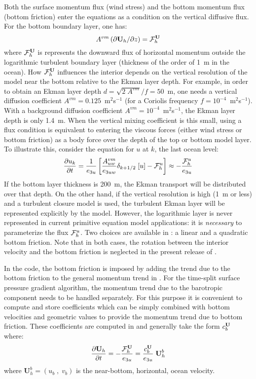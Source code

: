 \documentclass[../tex_main/NEMO_manual]{subfiles}
\begin{document}
Both the surface momentum flux (wind stress) and the bottom momentum flux (bottom friction) enter the equations as
a condition on the vertical diffusive flux.
For the bottom boundary layer, one has:
\begin{equation} \label{eq:zdfbfr_flux}
A^{vm} \left( \partial {\textbf U}_h / \partial z \right) = {{\cal F}}_h^{\textbf U}
\end{equation}
where ${\cal F}_h^{\textbf U}$ is represents the downward flux of horizontal momentum outside
the logarithmic turbulent boundary layer (thickness of the order of 1~m in the ocean).
How ${\cal F}_h^{\textbf U}$ influences the interior depends on the vertical resolution of the model near
the bottom relative to the Ekman layer depth.
For example, in order to obtain an Ekman layer depth $d = \sqrt{2\;A^{vm}} / f = 50$~m,
one needs a vertical diffusion coefficient $A^{vm} = 0.125$~m$^2$s$^{-1}$
(for a Coriolis frequency $f = 10^{-4}$~m$^2$s$^{-1}$).
With a background diffusion coefficient $A^{vm} = 10^{-4}$~m$^2$s$^{-1}$, the Ekman layer depth is only 1.4~m. 
When the vertical mixing coefficient is this small, using a flux condition is equivalent to
entering the viscous forces (either wind stress or bottom friction) as a body force over the depth of the top or
bottom model layer.
To illustrate this, consider the equation for $u$ at $k$, the last ocean level:
\begin{equation} \label{eq:zdfbfr_flux2}
\frac{\partial u_k}{\partial t} = \frac{1}{e_{3u}} \left[ \frac{A_{uw}^{vm}}{e_{3uw}} \delta_{k+1/2}\;[u] - {\cal F}^u_h \right] \approx - \frac{{\cal F}^u_{h}}{e_{3u}}
\end{equation}
If the bottom layer thickness is 200~m, the Ekman transport will be distributed over that depth.
On the other hand, if the vertical resolution is high (1~m or less) and a turbulent closure model is used,
the turbulent Ekman layer will be represented explicitly by the model.
However, the logarithmic layer is never represented in current primitive equation model applications:
it is \emph{necessary} to parameterize the flux ${\cal F}^u_h $.
Two choices are available in \NEMO: a linear and a quadratic bottom friction.
Note that in both cases, the rotation between the interior velocity and the bottom friction is neglected in
the present release of \NEMO.

In the code, the bottom friction is imposed by adding the trend due to the bottom friction to
the general momentum trend in .
For the time-split surface pressure gradient algorithm, the momentum trend due to
the barotropic component needs to be handled separately.
For this purpose it is convenient to compute and store coefficients which can be simply combined with
bottom velocities and geometric values to provide the momentum trend due to bottom friction.
These coefficients are computed in  and generally take the form $c_b^{\textbf U}$ where:
\begin{equation} \label{eq:zdfbfr_bdef}
\frac{\partial {\textbf U_h}}{\partial t} = 
  - \frac{{\cal F}^{\textbf U}_{h}}{e_{3u}} = \frac{c_b^{\textbf U}}{e_{3u}} \;{\textbf U}_h^b
\end{equation}
where $\textbf{U}_h^b = (u_b\;,\;v_b)$ is the near-bottom, horizontal, ocean velocity.
\end{document}
